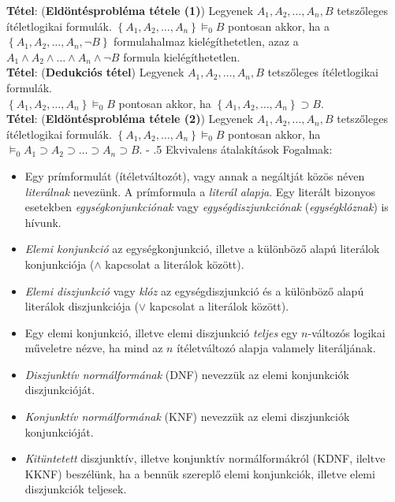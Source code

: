 \documentclass[tikz,12pt,margin=0px]{article}
\makeatletter
\renewcommand\paragraph{%
	\@startsection{paragraph}{4}{0mm}%
	{-\baselineskip}%
	{.5\baselineskip}%
	{\normalfont\normalsize\bfseries}}
\makeatother
\begin{document}
	\noindent \textbf{Tétel}: (\textbf{Eldöntésprobléma tétele (1)}) Legyenek $A_{1},A_{2},\ldots,A_{n}, B$ tetszőleges ítéletlogikai formulák.
	$\left\{A_{1},A_{2},\ldots,A_{n}\right\} \models_{0} B$ pontosan akkor, ha a $\left\{A_{1},A_{2},\ldots,A_{n}, \neg B\right\}$
	formulahalmaz kielégíthetetlen, azaz a\\
    $A_{1} \wedge A_{2} \wedge \ldots \wedge A_{n} \wedge \neg B$ formula kielégíthetetlen.\\

	\noindent \textbf{Tétel}: (\textbf{Dedukciós tétel}) Legyenek $A_{1},A_{2},\ldots,A_{n}, B$ tetszőleges ítéletlogikai formulák.\\
	$\left\{A_{1},A_{2},\ldots,A_{n}\right\} \models_{0} B$ pontosan akkor, ha
	$\left\{A_{1},A_{2},\ldots,A_{n}\right\} \supset B$.\\
	
	\noindent \textbf{Tétel}: (\textbf{Eldöntésprobléma tétele (2)}) Legyenek $A_{1},A_{2},\ldots,A_{n}, B$ tetszőleges ítéletlogikai formulák.
	$\left\{A_{1},A_{2},\ldots,A_{n}\right\} \models_{0} B$ pontosan akkor, ha
	$\models_{0} A_{1} \supset A_{2} \supset \ldots \supset A_{n} \supset B$.
\newpage	
	\paragraph{Ekvivalens átalakítások}
	Fogalmak:
	\begin{itemize}
		\item Egy prímformulát (ítéletváltozót), vagy annak a negáltját közös néven \textit{literálnak} nevezünk. A prímformula
		a \textit{literál alapja}. Egy literált bizonyos esetekben \textit{egységkonjunkciónak} vagy \textit{egységdiszjunkciónak}
		(\textit{egységklóznak}) is hívunk.
		
		\item \textit{Elemi konjunkció} az egységkonjunkció, illetve a különböző alapú literálok konjunkciója ($\wedge$ kapcsolat
		a literálok között).
        \item \textit{Elemi diszjunkció} vagy \textit{klóz} az egységdiszjunkció és a különböző alapú literálok
		diszjunkciója ($\vee$ kapcsolat a literálok között).
        \item Egy elemi konjunkció, illetve elemi diszjunkció \textit{teljes}
		egy $n$-változós logikai műveletre nézve, ha mind az $n$ ítéletváltozó alapja valamely literáljának.
		\item \textit{Diszjunktív normálformának} (DNF) nevezzük az elemi konjunkciók diszjunkcióját.
		\item \textit{Konjunktív normálformának} (KNF) nevezzük az elemi diszjunkciók konjunkcióját.
        \item \textit{Kitüntetett} diszjunktív, illetve konjunktív normálformákról (KDNF, ileltve KKNF) beszélünk, ha a bennük szereplő
		elemi konjunkciók, illetve elemi diszjunkciók teljesek.
	
	\end{itemize}	
	
\end{document}
